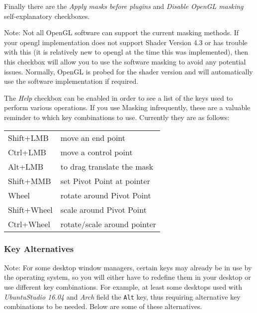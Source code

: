 Finally there are the \textit{Apply masks before plugins} and \textit{Disable OpenGL masking} self-explanatory checkboxes.

Note: Not all OpenGL software can support the current masking methods.  If your opengl implementation does not support Shader Version 4.3 or has trouble with this (it is relatively new to opengl at the time this was implemented), then this checkbox will allow you to use the software masking to avoid any potential issues.  Normally, OpenGL is probed for the shader version and will automatically use the software implementation if required.

The \textit{Help} checkbox can be enabled in order to see a list of the keys used to perform various operations.  If you use Masking infrequently, these are a valuable reminder to which key combinations to use.  Currently they are as follows:

\vspace{2ex}
\begin{tabular}{ll}
    \hline			
    Shift+LMB & move an end point \\
    Ctrl+LMB & move a control point \\
    Alt+LMB & to drag translate the mask \\
    Shift+MMB & set Pivot Point at pointer \\
    Wheel & rotate around Pivot Point \\
    Shift+Wheel & scale around Pivot Point \\
    Ctrl+Wheel & rotate/scale around pointer \\
    \hline  
\end{tabular}

\subsubsection*{Key Alternatives}%
\label{ssub:key_alternatives}

\vspace{2ex} Note: For some desktop window managers, certain keys may already be in use by the operating system, so you will either have to redefine them in your desktop or use different key combinations.  For example, at least some desktops used with \textit{UbuntuStudio 16.04} and \textit{Arch} field the \texttt{Alt} key, thus requiring alternative key combinations to be needed.  Below are some of these alternatives.

